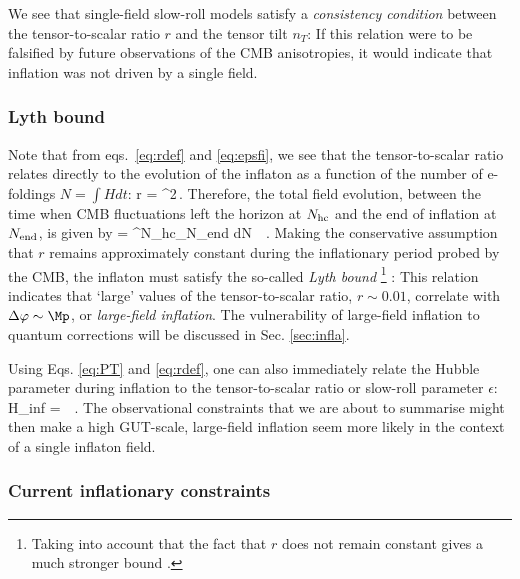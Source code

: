 We see that single-field slow-roll models satisfy a {\em consistency condition} between the tensor-to-scalar ratio $r$ and the tensor tilt $n_T$:
\be\label{eq:ccinfla}
\setlength\fboxsep{0.25cm}
\setlength\fboxrule{0.4pt}
\ee
 If this relation were to be falsified by future observations of the CMB anisotropies, it would indicate that inflation was not driven by a single field.

 \subsubsection{Lyth bound}

Note that from eqs.~\eqref{eq:rdef} and \eqref{eq:epsfi}, we see that  the tensor-to-scalar ratio relates directly to the evolution of the inflaton as a function of the number of e-foldings $N=\int H dt$:
 \be
 r =  \lp{}\rp^2\,.
 \ee
 Therefore,  the total field evolution, between the time when CMB fluctuations left the horizon at $N_{\rm hc}$ and the end of inflation at $N_{\rm end}$, is given by
 \be
 \frac{\Delta\varphi}{\Mp} = \int^{N_{\rm hc}}_{N_{\rm end}}{ dN \, } \,.
 \label{LythBound}
 \ee
 Making the conservative assumption that $r$ remains approximately constant during the inflationary period probed by the CMB, the inflaton must satisfy the so-called {\em Lyth bound} \footnote{Taking into account that the fact that $r$ does not
remain constant gives a much stronger bound \cite{Garcia-Bellido:2014wfa}.} \cite{Lyth:1996im,Boubekeur:2005zm}:
\be\label{eq:Lythbd}
\setlength\fboxsep{0.25cm}
\setlength\fboxrule{0.4pt}
\ee
This relation indicates that `large' values of the tensor-to-scalar ratio, $r \sim 0.01$, correlate with $\Delta\varphi \sim \Mp$, or {\em large-field inflation}. The vulnerability of large-field inflation to quantum corrections will be discussed in Sec. \ref{sec:infla}.

Using Eqs. \eqref{eq:PT} and \eqref{eq:rdef}, one can also immediately relate the Hubble parameter during inflation to the tensor-to-scalar ratio or slow-roll parameter $\epsilon$:
\be
H_{\rm inf} = \sqrt{8 \pi^2 \cP_\cR\,\epsilon}\, \Mp \,.
\ee
The observational constraints that we are about to summarise might then make a high GUT-scale, large-field inflation seem more likely in the context of a single inflaton field.

\subsubsection{Current inflationary constraints}

